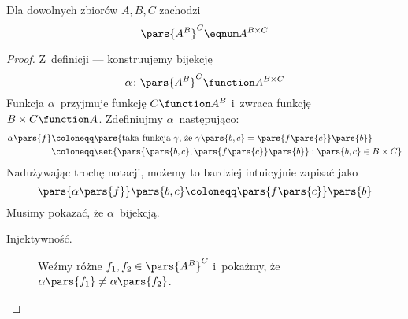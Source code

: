 \begin{theorem}
	Dla dowolnych zbiorów \(A, B, C\) zachodzi
	\begin{equation*}
		\pars{A^B}^C \eqnum A^{B \times C}
	\end{equation*}
\end{theorem}
\begin{proof}
	Z~definicji --- konstruujemy bijekcję
	\begin{equation*}
		\alpha\colon \pars{A^B}^C \function A^{B \times C}
	\end{equation*}
	Funkcja \(\alpha\)~przyjmuje funkcję \(C \function A^B\) i~zwraca funkcję \(B \times C \function A\). Zdefiniujmy \(\alpha\)~następująco:
	\begin{equation*}
		\begin{split}
			\alpha\pars{f}
			 & \coloneqq \pars{\text{taka funkcja \(\gamma\), że \(\gamma\pars{b, c} = \pars{f\pars{c}}\pars{b}\)}} \\
			 & \coloneqq \set{\pars{\pars{b, c}, \pars{f\pars{c}}\pars{b}} : \pars{b, c} \in B \times C}
		\end{split}
	\end{equation*}
	Nadużywając trochę notacji, możemy to bardziej intuicyjnie zapisać jako
	\begin{equation*}
		\pars{\alpha\pars{f}}\pars{b, c} \coloneqq \pars{f\pars{c}}\pars{b}
	\end{equation*}
	Musimy pokazać, że \(\alpha\)~bijekcją.
	\begin{description}
		\item[Injektywność.] Weźmy różne \(f_1, f_2 \in \pars{A^B}^C\) i~pokażmy, że \(\alpha\pars{f_1} \neq \alpha\pars{f_2}\).


\end{description}
\end{proof}
